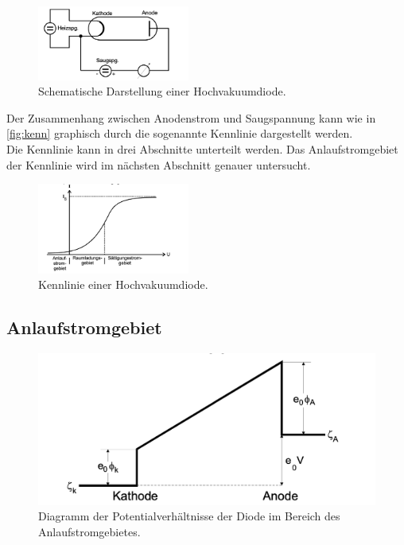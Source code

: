 \begin{figure}[H]
  \centering
  \includegraphics[width=5cm]{content/hochvdiode}
  \caption{Schematische Darstellung einer Hochvakuumdiode.\cite{sample}}
  \label{fig:hochvdiode}
\end{figure}
Der Zusammenhang zwischen Anodenstrom und Saugspannung kann wie in \autoref{fig:kenn} graphisch durch die sogenannte Kennlinie dargestellt werden.\\
Die Kennlinie kann in drei Abschnitte unterteilt werden.
Das Anlaufstromgebiet der Kennlinie wird im nächsten Abschnitt genauer untersucht.
\begin{figure}[H]
  \centering
  \includegraphics[width=5cm]{content/kenn}
  \caption{Kennlinie einer Hochvakuumdiode.\cite{sample}}
  \label{fig:kenn}
\end{figure}


\subsection{Anlaufstromgebiet}


\begin{figure}
  \centering
  \includegraphics[width=\textwidth]{content/potential}
  \caption{Diagramm der Potentialverhältnisse der Diode im Bereich des Anlaufstromgebietes.\cite{sample}}
  \label{fig:potential}
\end{figure}

